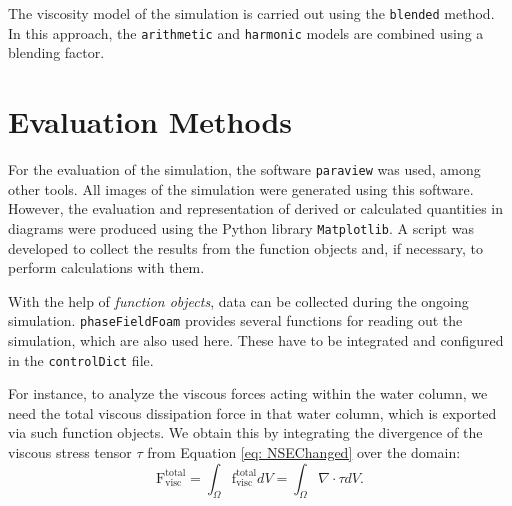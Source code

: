 The viscosity model of the simulation is carried out using the \texttt{blended} method. In this approach, the \texttt{arithmetic} and \texttt{harmonic} models are combined using a blending factor.


\section{Evaluation Methods}
For the evaluation of the simulation, the software \texttt{paraview} was used, among other tools. All images of the simulation were generated using this software. However, the evaluation and representation of derived or calculated quantities in diagrams were produced using the Python library \texttt{Matplotlib}. A script was developed to collect the results from the function objects and, if necessary, to perform calculations with them.

With the help of \textit{function objects}, data can be collected during the ongoing simulation. \texttt{phaseFieldFoam} provides several functions for reading out the simulation, which are also used here. These have to be integrated and configured in the \texttt{controlDict} file.

For instance, to analyze the viscous forces acting within the water column, we need the total viscous dissipation force in that water column, which is exported via such function objects. We obtain this by integrating the divergence of the viscous stress tensor $\tau$ from Equation \ref{eq: NSEChanged} over the domain:
\begin{equation}
    \mathrm{F}_{\mathrm{visc}}^{\mathrm{total}} = \int_{\Omega} \mathrm{f}_{\mathrm{visc}}^{\mathrm{total}} dV = \int_{\Omega} \nabla \cdot \tau dV.
\end{equation}

